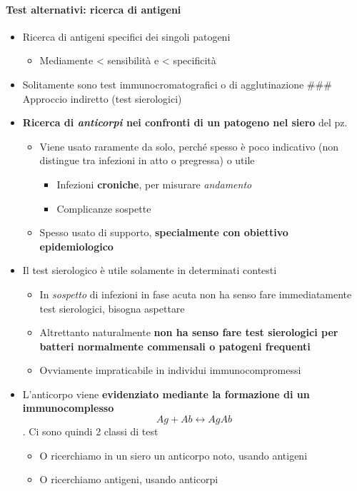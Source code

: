 \documentclass[italian,]{article}
\providecommand{\tightlist}{%
  \setlength{\itemsep}{0pt}\setlength{\parskip}{0pt}}
\begin{document}
\hypertarget{test-alternativi-ricerca-di-antigeni}{%
\paragraph{Test alternativi: ricerca di
antigeni}\label{test-alternativi-ricerca-di-antigeni}}

\begin{itemize}
\tightlist
\item
  Ricerca di antigeni specifici dei singoli patogeni

  \begin{itemize}
  \tightlist
  \item
    Mediamente \textless{} sensibilità e \textless{} specificità
  \end{itemize}
\item
  Solitamente sono test immunocromatografici o di agglutinazione \#\#\#
  Approccio indiretto (test sierologici)
\item
  \textbf{Ricerca di \emph{anticorpi} nei confronti di un patogeno nel
  siero} del pz.

  \begin{itemize}
  \tightlist
  \item
    Viene usato raramente da solo, perché spesso è poco indicativo (non
    distingue tra infezioni in atto o pregressa) o utile

    \begin{itemize}
    \tightlist
    \item
      Infezioni \textbf{croniche}, per misurare \emph{andamento}
    \item
      Complicanze sospette
    \end{itemize}
  \item
    Spesso usato di supporto, \textbf{specialmente con obiettivo
    epidemiologico}
  \end{itemize}
\item
  Il test sierologico è utile solamente in determinati contesti

  \begin{itemize}
  \tightlist
  \item
    In \emph{sospetto} di infezioni in fase acuta non ha senso fare
    immediatamente test sierologici, bisogna aspettare
  \item
    Altrettanto naturalmente \textbf{non ha senso fare test sierologici
    per batteri normalmente commensali o patogeni frequenti}
  \item
    Ovviamente impraticabile in individui immunocompromessi
  \end{itemize}
\item
  L'anticorpo viene \textbf{evidenziato mediante la formazione di un
  immunocomplesso} \[ Ag + Ab \leftrightarrow AgAb\]. Ci sono quindi 2
  classi di test

  \begin{itemize}
  \tightlist
  \item
    O ricerchiamo in un siero un anticorpo noto, usando antigeni
  \item
    O ricerchiamo antigeni, usando anticorpi
  \end{itemize}
\end{itemize}
\end{document}
